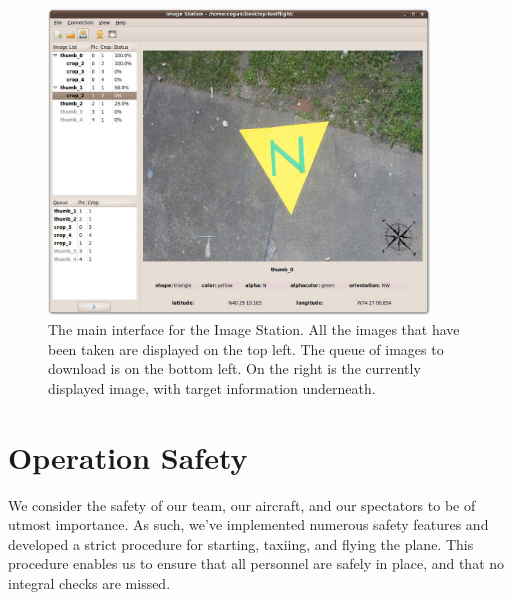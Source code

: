 \documentclass[pdftex,10pt,letter]{article}
\begin{document}
\begin{figure} [h]
  \centering
  	\includegraphics[width=0.9\textwidth]{../images/ImageStationMain.jpg}
  	\caption[Image Station Interface]{The main interface for the Image Station.  All the images that have been taken are displayed on the top left.  The queue of images to download is on the bottom left.  On the right is the currently displayed image, with target information underneath.}
  	\label{fig:imagestationinterface}
\end{figure}

\section{Operation Safety}

We consider the safety of our team, our aircraft, and our spectators to be of utmost importance.  As such, we've implemented numerous safety features and developed a strict procedure for starting, taxiing, and flying the plane.  This procedure enables us to ensure that all personnel are safely in place, and that no integral checks are missed.
\end{document}
